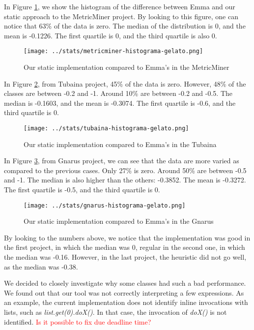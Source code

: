 \documentclass{sig-alternate}
\begin{document}
In Figure \ref{fig:metricminer}, we show the histogram of the difference between Emma and our static approach to
the MetricMiner project. By looking to this figure, one can notice that 63\% of the data is zero. 
The median of the distribution is 0, and the mean is -0.1226. The first quartile is 0, and the
third quartile is also 0.

\begin{figure}[h!H]
  \centering
  \texttt{[image: ../stats/metricminer-histograma-gelato.png]}
  \caption{Our static implementation compared to Emma's in the MetricMiner}
  \label{fig:metricminer}
\end{figure}

In Figure \ref{fig:tubaina}, from Tubaina project, 45\% of the data is zero. 
However, 48\% of the classes are between -0.2 and -1. Around 10\% are between -0.2 and -0.5.
The median is -0.1603, and the mean is -0.3074. The first quartile is
-0.6, and the third quartile is 0.

\begin{figure}[h!H]
  \centering
  \texttt{[image: ../stats/tubaina-histograma-gelato.png]}
  \caption{Our static implementation compared to Emma's in the Tubaina}
  \label{fig:tubaina}
\end{figure}


In Figure \ref{fig:gnarus}, from Gnarus project, we can see that the data are more varied as 
compared to the previous cases. Only 27\% is zero. Around 50\% are between -0.5 and -1. 
The median is also higher than the others: -0.3852. The mean is -0.3272. The first quartile
is -0.5, and the third quartile is 0.

\begin{figure}[h!H]
  \centering
  \texttt{[image: ../stats/gnarus-histograma-gelato.png]}
  \caption{Our static implementation compared to Emma's in the Gnarus}
  \label{fig:gnarus}
\end{figure}

By looking to the numbers above, we notice that the implementation was good in the first project,
in which the median was 0, regular in the second one, in which the median was -0.16. However,
in the last project, the heuristic did not go well, as the median was -0.38.

We decided to closely investigate why some classes had such a bad performance. We found out
that our tool was not correctly interpreting a few expressions. As an example, 
the current implementation does not identify inline invocations with lists, such
as \textit{list.get(0).doX()}. In that case, the invocation of \textit{doX()} is not identified. \textcolor{red}{Is it possible to fix due deadline time?}
\end{document}
